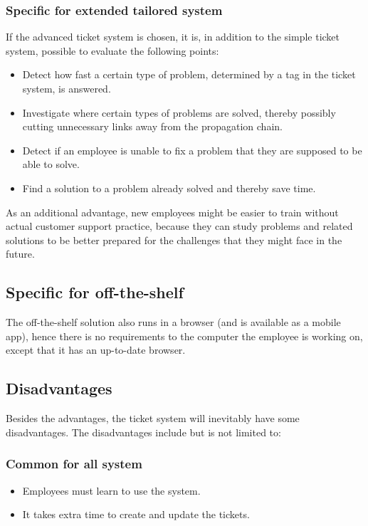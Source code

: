 \subsubsection{Specific for extended tailored system}
If the advanced ticket system is chosen, it is, in addition to the simple ticket system, possible to evaluate the following points:
\begin{itemize}
	\item Detect how fast a certain type of problem, determined by a tag in the ticket system, is answered.
	\item Investigate where certain types of problems are solved, thereby possibly cutting unnecessary links away from the propagation chain.
	\item Detect if an employee is unable to fix a problem that they are supposed to be able to solve.
	\item Find a solution to a problem already solved and thereby save time.
\end{itemize}
As an additional advantage, new employees might be easier to train without actual customer support practice, because they can study problems and related solutions to be better prepared for the challenges that they might face in the future.

\subsection{Specific for off-the-shelf}
The off-the-shelf solution also runs in a browser (and is available as a mobile app), hence there is no requirements to the computer the employee is working on, except that it has an up-to-date browser.

\subsection{Disadvantages}
Besides the advantages, the ticket system will inevitably have some disadvantages. The disadvantages include but is not limited to:

\subsubsection{Common for all system}
\begin{itemize}
	\item Employees must learn to use the system.
	\item It takes extra time to create and update the tickets.
\end{itemize}

